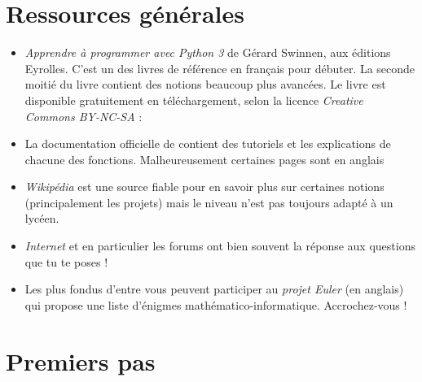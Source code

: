 \documentclass[11pt,class=report,crop=false]{standalone}
\begin{document}


\section*{Ressources générales}

\begin{itemize}
  \item \emph{Apprendre à programmer avec Python 3} de Gérard Swinnen, aux éditions Eyrolles.
   C'est un des livres de référence en français pour débuter. La seconde moitié du livre contient des notions beaucoup plus avancées. 
  Le livre est disponible gratuitement en téléchargement, selon la licence \emph{Creative Commons BY-NC-SA} :  

  \item La documentation officielle de \Python{} contient des tutoriels et les explications de chacune des fonctions. Malheureusement certaines pages sont en anglais  

  \item \emph{Wikipédia} est une source fiable pour en savoir plus sur certaines notions (principalement les projets) mais le niveau n'est pas toujours adapté à un lycéen.
  
  \item \emph{Internet} et en particulier les forums ont bien souvent la réponse aux questions que tu te poses ! 
  
  \item Les plus fondus d'entre vous peuvent participer au \emph{projet Euler} (en anglais) qui propose une liste d'énigmes mathématico-informatique. Accrochez-vous !  

\end{itemize}


\section{Premiers pas}
\end{document}
